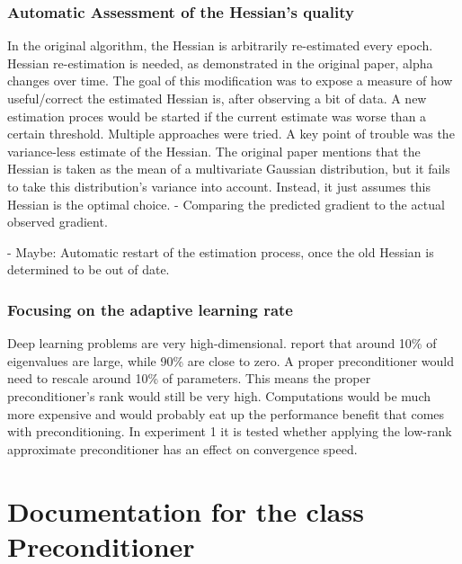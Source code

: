 \documentclass[twoside,12pt,a4paper]{report}
\begin{document}
\subsubsection{Automatic Assessment of the Hessian's quality}
In the original algorithm, the Hessian is arbitrarily re-estimated every epoch. Hessian re-estimation is needed, as demonstrated in the original paper, alpha changes over time. The goal of this modification was to expose a measure of how useful/correct the estimated Hessian is, after observing a bit of data. A new estimation proces would be started if the current estimate was worse than a certain threshold. Multiple approaches were tried. A key point of trouble was the variance-less estimate of the Hessian. The original paper mentions that the Hessian is taken as the mean of a multivariate Gaussian distribution, but it fails to take this distribution's variance into account. Instead, it just assumes this Hessian is the optimal choice. 
- Comparing the predicted gradient to the actual observed gradient.

- Maybe: Automatic restart of the estimation process, once the old Hessian is determined to be out of date.

\subsubsection{Focusing on the adaptive learning rate}
Deep learning problems are very high-dimensional. \cite{Chaudhari2017entropy} report that around 10\% of eigenvalues are large, while 90\% are close to zero. A proper preconditioner would need to rescale around 10\% of parameters. This means the proper preconditioner's rank would still be very high. Computations would be much more expensive and would probably eat up the performance benefit that comes with preconditioning.
In experiment 1 it is tested whether applying the low-rank approximate preconditioner has an effect on convergence speed.

\section{Documentation for the class Preconditioner}
\end{document}
